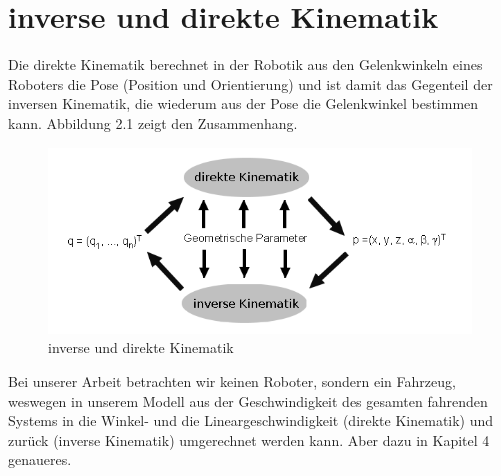 \section{inverse und direkte Kinematik}
\label{subsec:inverse und direkte Kinematik}
Die direkte Kinematik berechnet in der Robotik aus den Gelenkwinkeln eines Roboters die Pose (Position und Orientierung) und ist damit das Gegenteil der inversen Kinematik, die wiederum aus der Pose die Gelenkwinkel bestimmen kann. Abbildung 2.1 zeigt den Zusammenhang.
\begin{figure}[htb]
  \centering  
  \includegraphics[scale=2.5]{img/Roboterkinematik.png}
  \caption{inverse und direkte Kinematik}
  \label{fig:inverse und direkte Kinematik}
\end{figure}
Bei unserer Arbeit betrachten wir keinen Roboter, sondern ein Fahrzeug, weswegen in unserem Modell aus der Geschwindigkeit des gesamten fahrenden Systems in die Winkel- und die Lineargeschwindigkeit (direkte Kinematik) und zurück (inverse Kinematik) umgerechnet werden kann. Aber dazu in Kapitel 4 genaueres.


